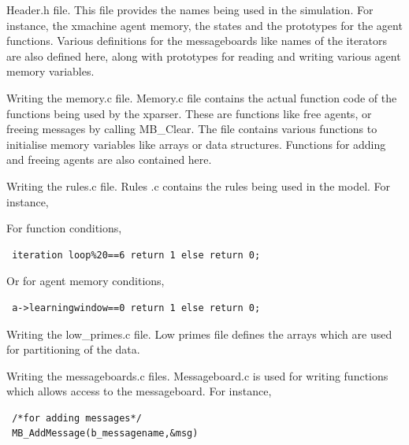 \documentclass[a4paper,11pt]{article}
\newenvironment{mylisting}
{\begin{list}{}{\setlength{\leftmargin}{1em}}\item\small\bfseries}
{\end{list}}
\begin{document}
\begin{enumerate}
\item Header.h file. This file provides the names being used in the simulation. For instance, the
 xmachine agent memory, the states and the prototypes for the agent functions.
Various definitions for the messageboards like names of the
iterators are also defined here, along with prototypes for reading
and writing various agent memory variables.

\item Writing the memory.c file. Memory.c file contains the actual function code of the functions
 being used by the xparser. These are functions like free agents, or freeing messages by calling MB\_Clear. The file contains various functions to initialise memory variables like arrays or data structures. Functions for adding and freeing agents are also contained here.

\item Writing the rules.c file. Rules .c contains the rules being used in the model. For instance,

\begin{itemize}
\item For function conditions,

\begin{mylisting}
\begin{verbatim}
 iteration loop%20==6 return 1 else return 0;
 \end{verbatim}
 \end{mylisting}

 \item Or for agent memory conditions,\\

 \begin{mylisting}
\begin{verbatim}
 a->learningwindow==0 return 1 else return 0;
 \end{verbatim}
 \end{mylisting}

 \end{itemize}

 \item Writing the low\_primes.c file. Low primes file defines the arrays which are used for partitioning of the data.
 \item Writing the messageboards.c files. Messageboard.c is used for writing functions which allows access to the messageboard. For instance,\\

 \begin{mylisting}
\begin{verbatim}
 /*for adding messages*/
 MB_AddMessage(b_messagename,&msg)


\end{verbatim}
\end{mylisting}
\end{enumerate}
\end{document}
